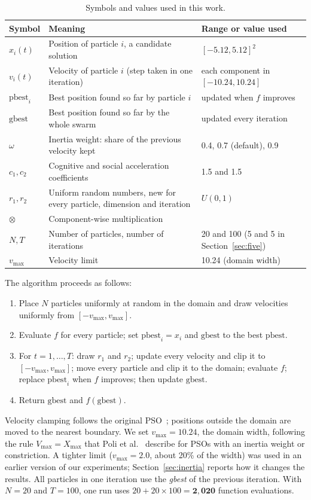 \documentclass[11pt,a4paper]{article}
\newcommand{\pb}{\mathrm{pbest}}
\newcommand{\gb}{\mathrm{gbest}}
\newcommand{\vmax}{v_{\max}}
\newcommand{\tn}[1]{\textit{#1}}
\begin{document}
\begin{table}[ht]
\centering
\caption{Symbols and values used in this work.}\label{tab:symbols}
\small
\begin{tabular}{@{}p{2.0cm}p{9.0cm}p{5.0cm}@{}}
\toprule
\textbf{Symbol} & \textbf{Meaning} & \textbf{Range or value used}\\
\midrule
$x_i(t)$ & Position of particle $i$, a candidate solution & $[-5.12,5.12]^2$\\
$v_i(t)$ & Velocity of particle $i$ (step taken in one iteration) & each component in $[-10.24,10.24]$\\
$\pb_i$ & Best position found so far by particle $i$ & updated when $f$ improves\\
$\gb$ & Best position found so far by the whole swarm & updated every iteration\\
$\omega$ & Inertia weight: share of the previous velocity kept & 0.4, 0.7 (default), 0.9\\
$c_1,c_2$ & Cognitive and social acceleration coefficients & 1.5 and 1.5\\
$r_1,r_2$ & Uniform random numbers, new for every particle, dimension and iteration & $U(0,1)$\\
$\otimes$ & Component-wise multiplication & \\
$N,T$ & Number of particles, number of iterations & 20 and 100 (5 and 5 in Section~\ref{sec:five})\\
$\vmax$ & Velocity limit & 10.24 (domain width)\\
\bottomrule
\end{tabular}
\end{table}

The algorithm proceeds as follows:
\begin{enumerate}
\item Place $N$ particles uniformly at random in the domain and draw velocities uniformly from $[-\vmax,\vmax]$.
\item Evaluate $f$ for every particle; set $\pb_i=x_i$ and $\gb$ to the best $\pb$.
\item For $t=1,\dots,T$: draw $r_1$ and $r_2$; update every velocity and clip it to $[-\vmax,\vmax]$; move every particle and clip it to the domain; evaluate $f$; replace $\pb_i$ when $f$ improves; then update $\gb$.
\item Return $\gb$ and $f(\gb)$.
\end{enumerate}

Velocity clamping follows the original PSO~\cite[Sect.~2.2]{poli2007}; positions outside the domain are moved to the nearest boundary. We set $\vmax=10.24$, the domain width, following the rule $V_{\max}=X_{\max}$ that Poli et al.~\cite[Sects.~2.3--2.4]{poli2007} describe for PSOs with an inertia weight or constriction. A tighter limit ($\vmax=2.0$, about 20\% of the width) was used in an earlier version of our experiments; Section~\ref{sec:inertia} reports how it changes the results. All particles in one iteration use the \tn{gbest} of the previous iteration. With $N=20$ and $T=100$, one run uses $20+20\times100=\mathbf{2{,}020}$ function evaluations.
\end{document}
